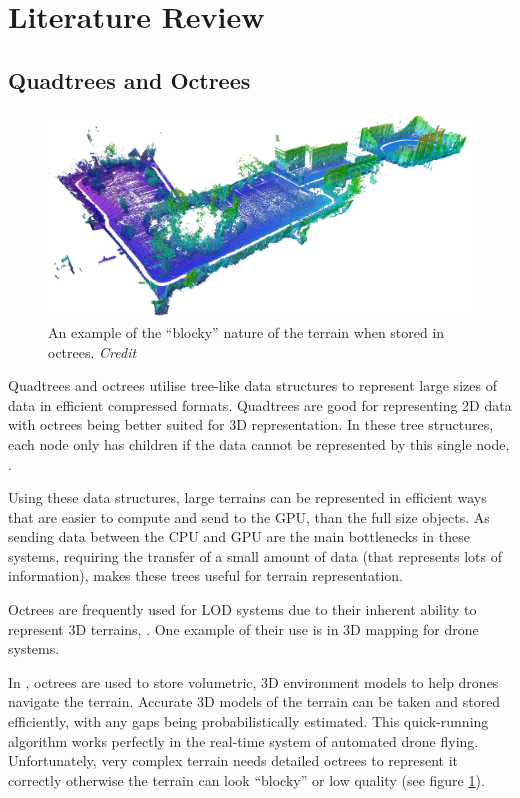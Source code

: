 \documentclass[notitlepage,12pt]{article}
\begin{document}
\section{Literature Review}

\subsection{Quadtrees and Octrees}

\begin{figure}[ht]
  \centering
  \includegraphics[width=1.0\textwidth]{octomap.png}
  \caption{An example of the ``blocky'' nature of the terrain when stored in octrees. \textit{Credit \cite{octrees}}}
  \label{fig:octrees}
\end{figure}

Quadtrees and octrees utilise tree-like data structures to represent large sizes of data in efficient compressed formats. Quadtrees are good for representing 2D data with octrees being better suited for 3D representation. In these tree structures, each node only has children if the data cannot be represented by this single node, \cite{quadtreesOctrees}. 

Using these data structures, large terrains can be represented in efficient ways that are easier to compute and send to the GPU, than the full size objects. As sending data between the CPU and GPU are the main bottlenecks in these systems, requiring the transfer of a small amount of data (that represents lots of information), makes these trees useful for terrain representation.

Octrees are frequently used for LOD systems due to their inherent ability to represent 3D terrains, \cite{lod}. One example of their use is in 3D mapping for drone systems. 

In \cite{octrees}, octrees are used to store volumetric, 3D environment models to help drones navigate the terrain. Accurate 3D models of the terrain can be taken and stored efficiently, with any gaps being probabilistically estimated. This quick-running algorithm works perfectly in the real-time system of automated drone flying. Unfortunately, very complex terrain needs detailed octrees to represent it correctly otherwise the terrain can look ``blocky'' or low quality (see figure \ref{fig:octrees}).
\end{document}
